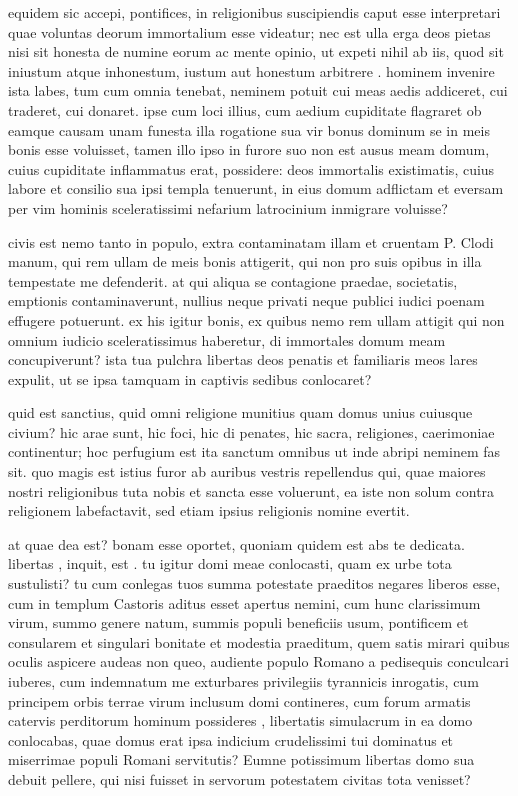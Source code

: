  equidem sic accepi, pontifices, in religionibus suscipiendis caput esse interpretari quae voluntas deorum immortalium esse videatur; nec est ulla erga deos pietas nisi sit honesta de numine eorum ac mente opinio, ut expeti nihil ab iis, quod sit iniustum atque inhonestum, iustum aut honestum arbitrere . hominem invenire ista labes, tum cum omnia tenebat, neminem potuit cui meas aedis addiceret, cui traderet, cui donaret. ipse cum loci illius, cum aedium cupiditate flagraret ob eamque causam unam funesta illa rogatione sua vir bonus dominum se in meis bonis esse voluisset, tamen illo ipso in furore suo non est ausus meam domum, cuius cupiditate inflammatus erat, possidere: deos immortalis existimatis, cuius labore et consilio sua ipsi templa tenuerunt, in eius domum adflictam et eversam per vim hominis sceleratissimi nefarium latrocinium inmigrare voluisse?

 civis est nemo tanto in populo, extra contaminatam illam et cruentam P. Clodi manum, qui rem ullam de meis bonis attigerit, qui non pro suis opibus in illa tempestate me defenderit. at qui aliqua se contagione praedae, societatis, emptionis contaminaverunt, nullius neque privati neque publici iudici poenam effugere potuerunt. ex his igitur bonis, ex quibus nemo rem ullam attigit qui non omnium iudicio sceleratissimus haberetur, di immortales domum meam concupiverunt? ista tua pulchra libertas deos penatis et familiaris meos lares expulit, ut se ipsa tamquam in captivis sedibus conlocaret?

 quid est sanctius, quid omni religione munitius quam domus unius cuiusque civium? hic arae sunt, hic foci, hic di penates, hic sacra, religiones, caerimoniae continentur; hoc perfugium est ita sanctum omnibus ut inde abripi neminem fas sit. quo magis est istius furor ab auribus vestris repellendus qui, quae maiores nostri religionibus tuta nobis et sancta esse voluerunt, ea iste non solum contra religionem labefactavit, sed etiam ipsius religionis nomine evertit.

 at quae dea est? bonam esse oportet, quoniam quidem est abs te dedicata. libertas , inquit, est . tu igitur domi meae conlocasti, quam ex urbe tota sustulisti? tu cum conlegas tuos summa potestate praeditos negares liberos esse, cum in templum Castoris aditus esset apertus nemini, cum hunc clarissimum virum, summo genere natum, summis populi beneficiis usum, pontificem et consularem et singulari bonitate et modestia praeditum, quem satis mirari quibus oculis aspicere audeas non queo, audiente populo Romano a pedisequis conculcari iuberes, cum indemnatum me exturbares privilegiis tyrannicis inrogatis, cum principem orbis terrae virum inclusum domi contineres, cum forum armatis catervis perditorum hominum possideres , libertatis simulacrum in ea domo conlocabas, quae domus erat ipsa indicium crudelissimi tui dominatus et miserrimae populi Romani servitutis? Eumne potissimum libertas domo sua debuit pellere, qui nisi fuisset in servorum potestatem civitas tota venisset?

